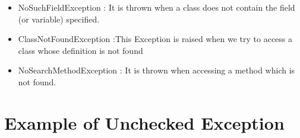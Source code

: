 \documentclass{article}
\begin{document}
\begin{itemize}
    \item NoSuchFieldException : It is thrown when a class does not contain the field (or variable) specified.
    
    
    \item ClassNotFoundException :This Exception is raised when we try to access a class whose definition is not found
    
    \item NoSearchMethodException : It is thrown when accessing a method which is not found.
\end{itemize}


\section{Example of Unchecked Exception}
\begin{itemize}


\end{itemize}
\end{document}
